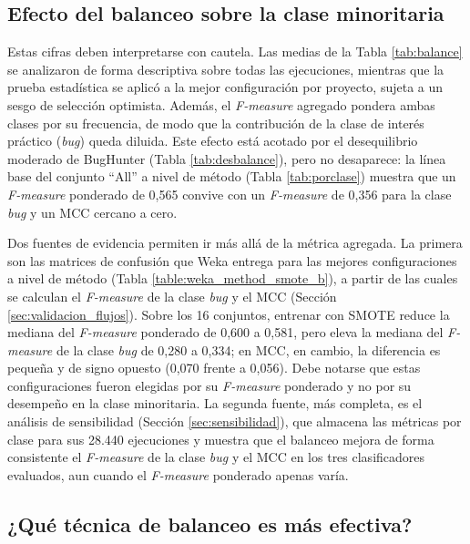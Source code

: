 \subsection{Efecto del balanceo sobre la clase minoritaria}

Estas cifras deben interpretarse con cautela. Las medias de la Tabla \ref{tab:balance} se analizaron de forma descriptiva sobre todas las ejecuciones, mientras que la prueba estadística se aplicó a la mejor configuración por proyecto, sujeta a un sesgo de selección optimista. Además, el \textit{F-measure} agregado pondera ambas clases por su frecuencia, de modo que la contribución de la clase de interés práctico (\textit{bug}) queda diluida. Este efecto está acotado por el desequilibrio moderado de BugHunter (Tabla \ref{tab:desbalance}), pero no desaparece: la línea base del conjunto ``All'' a nivel de método (Tabla \ref{tab:porclase}) muestra que un \textit{F-measure} ponderado de 0,565 convive con un \textit{F-measure} de 0,356 para la clase \textit{bug} y un MCC cercano a cero.

Dos fuentes de evidencia permiten ir más allá de la métrica agregada. La primera son las matrices de confusión que Weka entrega para las mejores configuraciones a nivel de método (Tabla \ref{table:weka_method_smote_b}), a partir de las cuales se calculan el \textit{F-measure} de la clase \textit{bug} y el MCC (Sección \ref{sec:validacion_flujos}). Sobre los 16 conjuntos, entrenar con SMOTE reduce la mediana del \textit{F-measure} ponderado de 0,600 a 0,581, pero eleva la mediana del \textit{F-measure} de la clase \textit{bug} de 0,280 a 0,334; en MCC, en cambio, la diferencia es pequeña y de signo opuesto (0,070 frente a 0,056). Debe notarse que estas configuraciones fueron elegidas por su \textit{F-measure} ponderado y no por su desempeño en la clase minoritaria. La segunda fuente, más completa, es el análisis de sensibilidad (Sección \ref{sec:sensibilidad}), que almacena las métricas por clase para sus 28.440 ejecuciones y muestra que el balanceo mejora de forma consistente el \textit{F-measure} de la clase \textit{bug} y el MCC en los tres clasificadores evaluados, aun cuando el \textit{F-measure} ponderado apenas varía.

\subsection{¿Qué técnica de balanceo es más efectiva?}

